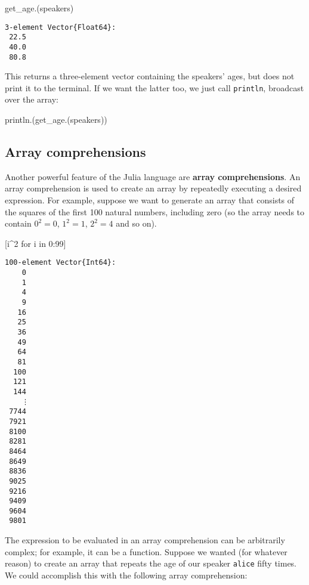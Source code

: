 \documentclass[
  letterpaper,
  DIV=11,
  numbers=noendperiod]{scrartcl}
\newenvironment{Shaded}{\begin{snugshade}}{\end{snugshade}}
\newcommand{\FloatTok}[1]{\textcolor[rgb]{0.68,0.00,0.00}{#1}}
\newcommand{\FunctionTok}[1]{\textcolor[rgb]{0.28,0.35,0.67}{#1}}
\newcommand{\KeywordTok}[1]{\textcolor[rgb]{0.00,0.23,0.31}{#1}}
\newcommand{\NormalTok}[1]{\textcolor[rgb]{0.00,0.23,0.31}{#1}}
\newcommand{\OperatorTok}[1]{\textcolor[rgb]{0.37,0.37,0.37}{#1}}
\begin{document}
\begin{Shaded}
\begin{Highlighting}[]
\FunctionTok{get\_age}\NormalTok{.(speakers)}
\end{Highlighting}
\end{Shaded}

\begin{verbatim}
3-element Vector{Float64}:
 22.5
 40.0
 80.8
\end{verbatim}

This returns a three-element vector containing the speakers' ages, but
does not print it to the terminal. If we want the latter too, we just
call \texttt{println}, broadcast over the array:

\begin{Shaded}
\begin{Highlighting}[]
\FunctionTok{println}\NormalTok{.(}\FunctionTok{get\_age}\NormalTok{.(speakers))}
\end{Highlighting}
\end{Shaded}

\subsection{Array comprehensions}\label{array-comprehensions-3}

Another powerful feature of the Julia language are \textbf{array
comprehensions}. An array comprehension is used to create an array by
repeatedly executing a desired expression. For example, suppose we want
to generate an array that consists of the squares of the first 100
natural numbers, including zero (so the array needs to contain
\(0^2 = 0\), \(1^2 = 1\), \(2^2 = 4\) and so on).

\begin{Shaded}
\begin{Highlighting}[]
\NormalTok{[i}\OperatorTok{\^{}}\FloatTok{2}\NormalTok{ for i }\KeywordTok{in} \FloatTok{0}\OperatorTok{:}\FloatTok{99}\NormalTok{]}
\end{Highlighting}
\end{Shaded}

\begin{verbatim}
100-element Vector{Int64}:
    0
    1
    4
    9
   16
   25
   36
   49
   64
   81
  100
  121
  144
    ⋮
 7744
 7921
 8100
 8281
 8464
 8649
 8836
 9025
 9216
 9409
 9604
 9801
\end{verbatim}

The expression to be evaluated in an array comprehension can be
arbitrarily complex; for example, it can be a function. Suppose we
wanted (for whatever reason) to create an array that repeats the age of
our speaker \texttt{alice} fifty times. We could accomplish this with
the following array comprehension:
\end{document}
